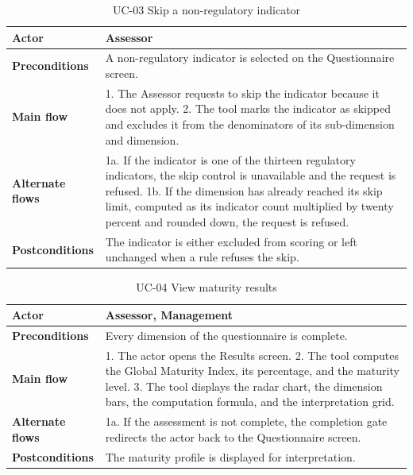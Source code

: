 \begin{table}[H]
\centering
\caption{UC-03 Skip a non-regulatory indicator}
\label{tab:uc03}
\begin{tabular}{|p{3cm}|p{12cm}|}
\hline
\textbf{Actor} & Assessor \\
\hline
\textbf{Preconditions} & A non-regulatory indicator is selected on the Questionnaire screen. \\
\hline
\textbf{Main flow} & 1. The Assessor requests to skip the indicator because it does not apply. 2. The tool marks the indicator as skipped and excludes it from the denominators of its sub-dimension and dimension. \\
\hline
\textbf{Alternate flows} & 1a. If the indicator is one of the thirteen regulatory indicators, the skip control is unavailable and the request is refused. 1b. If the dimension has already reached its skip limit, computed as its indicator count multiplied by twenty percent and rounded down, the request is refused. \\
\hline
\textbf{Postconditions} & The indicator is either excluded from scoring or left unchanged when a rule refuses the skip. \\
\hline
\end{tabular}
\end{table}

\begin{table}[H]
\centering
\caption{UC-04 View maturity results}
\label{tab:uc04}
\begin{tabular}{|p{3cm}|p{12cm}|}
\hline
\textbf{Actor} & Assessor, Management \\
\hline
\textbf{Preconditions} & Every dimension of the questionnaire is complete. \\
\hline
\textbf{Main flow} & 1. The actor opens the Results screen. 2. The tool computes the Global Maturity Index, its percentage, and the maturity level. 3. The tool displays the radar chart, the dimension bars, the computation formula, and the interpretation grid. \\
\hline
\textbf{Alternate flows} & 1a. If the assessment is not complete, the completion gate redirects the actor back to the Questionnaire screen. \\
\hline
\textbf{Postconditions} & The maturity profile is displayed for interpretation. \\
\hline
\end{tabular}
\end{table}

